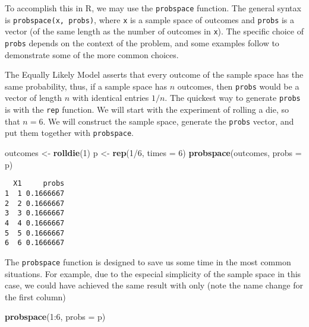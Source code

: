 \documentclass[]{book}
\newenvironment{Shaded}{\begin{snugshade}}{\end{snugshade}}
\newcommand{\KeywordTok}[1]{\textcolor[rgb]{0.13,0.29,0.53}{\textbf{{#1}}}}
\newcommand{\DataTypeTok}[1]{\textcolor[rgb]{0.13,0.29,0.53}{{#1}}}
\newcommand{\DecValTok}[1]{\textcolor[rgb]{0.00,0.00,0.81}{{#1}}}
\newcommand{\StringTok}[1]{\textcolor[rgb]{0.31,0.60,0.02}{{#1}}}
\newcommand{\NormalTok}[1]{{#1}}
\numberwithin{equation}{chapter}
\numberwithin{figure}{chapter}
\theoremstyle{plain}
\theoremstyle{definition}
\theoremstyle{remark}
\theoremstyle{definition}
\theoremstyle{definition}
\theoremstyle{remark}
\let\BeginKnitrBlock\begin \let\EndKnitrBlock\end
\begin{document}
To accomplish this in R, we may use the \texttt{probspace} function. The
general syntax is \texttt{probspace(x,\ probs)}, where \texttt{x} is a
sample space of outcomes and \texttt{probs} is a vector (of the same
length as the number of outcomes in \texttt{x}). The specific choice of
\texttt{probs} depends on the context of the problem, and some examples
follow to demonstrate some of the more common choices.

\bigskip

\BeginKnitrBlock{example}
\protect\hypertarget{ex:unnamed-chunk-117}{}{\label{ex:unnamed-chunk-117}}The
Equally Likely Model asserts that every outcome of the sample space has
the same probability, thus, if a sample space has \(n\) outcomes, then
\texttt{probs} would be a vector of length \(n\) with identical entries
\(1/n\). The quickest way to generate \texttt{probs} is with the
\texttt{rep} function. We will start with the experiment of rolling a
die, so that \(n=6\). We will construct the sample space, generate the
\texttt{probs} vector, and put them together with \texttt{probspace}.
\EndKnitrBlock{example}

\begin{Shaded}
\begin{Highlighting}[]
\NormalTok{outcomes <-}\StringTok{ }\KeywordTok{rolldie}\NormalTok{(}\DecValTok{1}\NormalTok{) }
\NormalTok{p <-}\StringTok{ }\KeywordTok{rep}\NormalTok{(}\DecValTok{1}\NormalTok{/}\DecValTok{6}\NormalTok{, }\DataTypeTok{times =} \DecValTok{6}\NormalTok{) }
\KeywordTok{probspace}\NormalTok{(outcomes, }\DataTypeTok{probs =} \NormalTok{p) }
\end{Highlighting}
\end{Shaded}

\begin{verbatim}
  X1     probs
1  1 0.1666667
2  2 0.1666667
3  3 0.1666667
4  4 0.1666667
5  5 0.1666667
6  6 0.1666667
\end{verbatim}

The \texttt{probspace} function is designed to save us some time in the
most common situations. For example, due to the especial simplicity of
the sample space in this case, we could have achieved the same result
with only (note the name change for the first column)

\begin{Shaded}
\begin{Highlighting}[]
\KeywordTok{probspace}\NormalTok{(}\DecValTok{1}\NormalTok{:}\DecValTok{6}\NormalTok{, }\DataTypeTok{probs =} \NormalTok{p) }
\end{Highlighting}
\end{Shaded}
\end{document}
